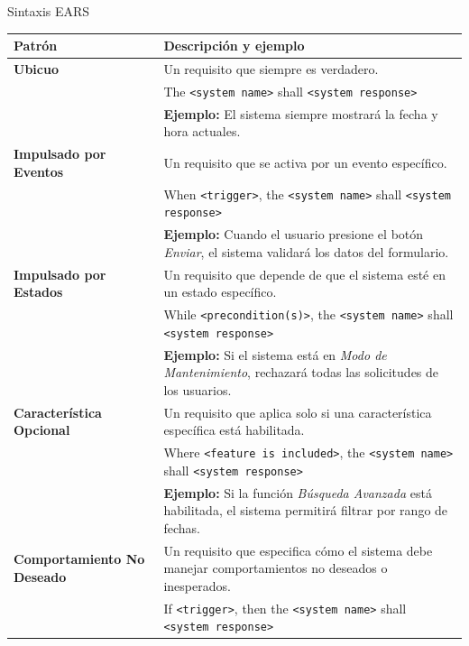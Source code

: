 \documentclass[
  24pt, %
  aspectratio=169, %
]{beamer}
\begin{document}
\begin{frame}{Sintaxis EARS}
  
  \tiny{
    \begin{table}[h!]
      \centering
      \begin{tabular}{|>{\raggedright\arraybackslash}p{3cm}|>{\raggedright\arraybackslash}p{10cm}|}
        \hline
        \textbf{Patrón} & \textbf{Descripción y ejemplo} \\
        \hline
        \textbf{Ubicuo} & 
        Un requisito que siempre es verdadero. \\
        & The \texttt{<system name>} shall \texttt{<system response>} \\
        & \textbf{Ejemplo:} 
        El sistema siempre mostrará la fecha y hora actuales. \\
        \hline
        \textbf{Impulsado por Eventos} & 
        Un requisito que se activa por un evento específico. \\
        & When \texttt{<trigger>}, the \texttt{<system name>} shall \texttt{<system response>} \\
        & \textbf{Ejemplo:} 
        Cuando el usuario presione el botón \textit{Enviar}, el sistema validará los datos del formulario. \\
        \hline
        \textbf{Impulsado por Estados} & 
        Un requisito que depende de que el sistema esté en un estado específico. \\
        & While \texttt{<precondition(s)>}, the \texttt{<system name>} shall \texttt{<system response>} \\
        & \textbf{Ejemplo:} Si el sistema está en \textit{Modo de Mantenimiento}, rechazará todas las solicitudes de los usuarios. \\
        \hline
        \textbf{Característica Opcional} & 
        Un requisito que aplica solo si una característica específica está habilitada. \\
        & Where \texttt{<feature is included>}, the \texttt{<system name>} shall \texttt{<system response>} \\
        & \textbf{Ejemplo:} Si la función \textit{Búsqueda Avanzada} está habilitada, el sistema permitirá filtrar por rango de fechas. \\
        \hline
        \textbf{Comportamiento No Deseado} & 
        Un requisito que especifica cómo el sistema debe manejar comportamientos no deseados o inesperados. \\
        & If \texttt{<trigger>}, then the \texttt{<system name>} shall \texttt{<system response>} \\

\end{tabular}
\end{table}}
\end{frame}
\end{document}
